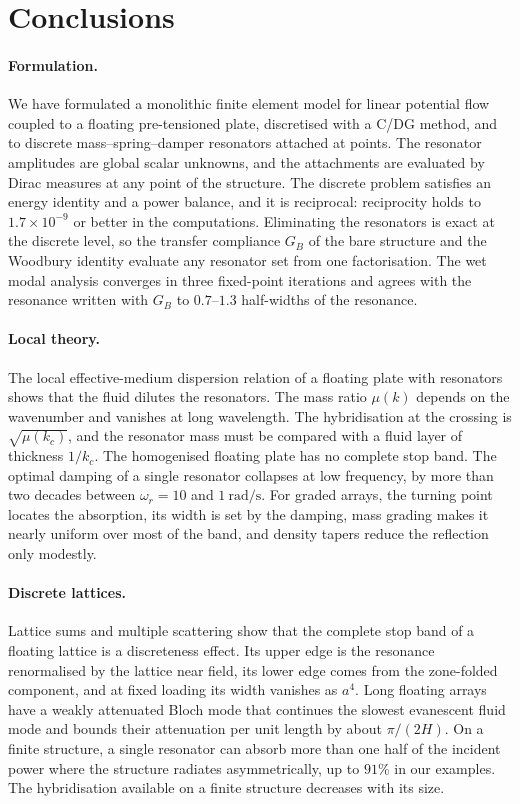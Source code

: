 {\section{Conclusions}\label{sec:conclusions}

\paragraph{Formulation.} We have formulated a monolithic finite element model for linear potential flow coupled to a floating pre-tensioned plate, discretised with a C/DG method, and to discrete mass--spring--damper resonators attached at points. The resonator amplitudes are global scalar unknowns, and the attachments are evaluated by Dirac measures at any point of the structure. The discrete problem satisfies an energy identity and a power balance, and it is reciprocal: reciprocity holds to $1.7\times10^{-9}$ or better in the computations. Eliminating the resonators is exact at the discrete level, so the transfer compliance $G_B$ of the bare structure and the Woodbury identity evaluate any resonator set from one factorisation. The wet modal analysis converges in three fixed-point iterations and agrees with the resonance written with $G_B$ to $0.7$--$1.3$ half-widths of the resonance.

\paragraph{Local theory.} The local effective-medium dispersion relation of a floating plate with resonators shows that the fluid dilutes the resonators. The mass ratio $\mu(k)$ depends on the wavenumber and vanishes at long wavelength. The hybridisation at the crossing is $\sqrt{\mu(k_c)}$, and the resonator mass must be compared with a fluid layer of thickness $1/k_c$. The homogenised floating plate has no complete stop band. The optimal damping of a single resonator collapses at low frequency, by more than two decades between $\omega_r=10$ and $1~\si{\radian\per\second}$. For graded arrays, the turning point locates the absorption, its width is set by the damping, mass grading makes it nearly uniform over most of the band, and density tapers reduce the reflection only modestly.

\paragraph{Discrete lattices.} Lattice sums and multiple scattering show that the complete stop band of a floating lattice is a discreteness effect. Its upper edge is the resonance renormalised by the lattice near field, its lower edge comes from the zone-folded component, and at fixed loading its width vanishes as $a^4$. Long floating arrays have a weakly attenuated Bloch mode that continues the slowest evanescent fluid mode and bounds their attenuation per unit length by about $\pi/(2H)$. On a finite structure, a single resonator can absorb more than one half of the incident power where the structure radiates asymmetrically, up to $91\%$ in our examples. The hybridisation available on a finite structure decreases with its size.

}
